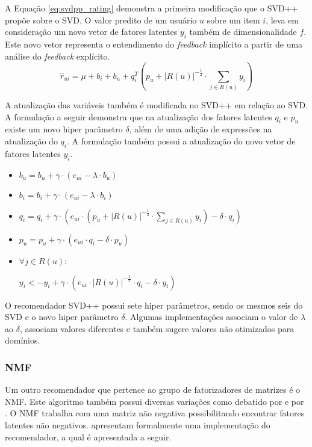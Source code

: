 A Equação \ref{eq:svdpp_rating} demonstra a primeira modificação que o \ac{SVD++} propõe sobre o \ac{SVD}. O valor predito de um usuário $u$ sobre um item $i$, leva em consideração um novo vetor de fatores latentes $y_i$ também de dimensionalidade $f$. Este novo vetor representa o entendimento do \textit{feedback} implícito a partir de uma análise do \textit{feedback} explícito.
\begin{equation}
    \label{eq:svdpp_rating}
    \hat{r}_{ui} = \mu + b_i + b_u + q_{i}^{T}(p_u + |R(u)|^{-\frac{1}{2}} \cdot \sum_{j \in R(u)}y_i)
\end{equation}

A atualização das variáveis também é modificada no \ac{SVD++} em relação ao \ac{SVD}. A formulação a seguir demonstra que na atualização dos fatores latentes $q_i$ e $p_u$ existe um novo hiper parâmetro $\delta$, além de uma adição de expressões na atualização do $q_i$. A formulação também possui a atualização do novo vetor de fatores latentes $y_i$.
\begin{itemize}
    \item $b_u = b_u + \gamma \cdot (e_{ui} - \lambda \cdot b_u)$
    
    \item $b_i = b_i + \gamma \cdot (e_{ui} - \lambda \cdot b_i)$
    
    \item $q_i = q_i + \gamma \cdot (e_{ui} \cdot (p_u + |R(u)|^{-\frac{1}{2}} \cdot \sum_{j \in R(u)}y_i ) - \delta \cdot q_i)$
    
    \item $p_u = p_u + \gamma \cdot (e_{ui} \cdot q_i - \delta \cdot p_u)$
    
    \item $\forall j \in R(u):$
    
    $y_i <- y_i + \gamma \cdot (e_{ui} \cdot |R(u)|^{-\frac{1}{2}} \cdot q_i - \delta \cdot y_i)$
\end{itemize}

O recomendador \ac{SVD++} possui sete hiper parâmetros, sendo os mesmos seis do \ac{SVD} e o novo hiper parâmetro $\delta$. Algumas implementações associam o valor de $\lambda$ ao $\delta$,  associam valores diferentes e também sugere valores não otimizados para domínios.

\subsubsection{NMF}
Um outro recomendador que pertence ao grupo de fatorizadores de matrizes é o \ac{NMF}. Este algoritmo também possui diversas variações como debatido por  e por . O \ac{NMF} trabalha com uma matriz não negativa possibilitando encontrar fatores latentes não negativos.  apresentam formalmente uma implementação do recomendador, a qual é apresentada a seguir. 

